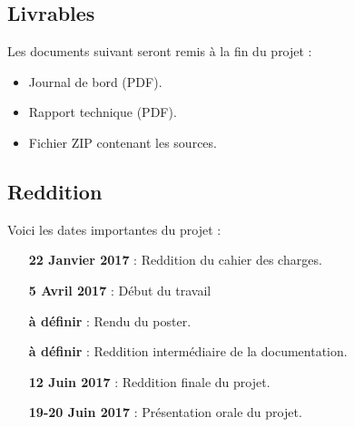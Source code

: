 \documentclass[a4paper, french]{article}
\begin{document}
\subsection{Livrables}
Les documents suivant seront remis à la fin du projet :

\begin{itemize}
    \item Journal de bord (PDF).
    \item Rapport technique (PDF).
    \item Fichier ZIP contenant les sources.
\end{itemize}

\subsection{Reddition}
Voici les dates importantes du projet : 

\begin{framed}
    \begin{itemize}[leftmargin=4cm]
        \item[\textbf{22 Janvier 2017} :] Reddition du cahier des charges.
        \item[\textbf{5 Avril 2017} :] Début du travail
        \item[\textbf{à définir} :] Rendu du poster.
        \item[\textbf{à définir} :] Reddition intermédiaire de la documentation.
        \item[\textbf{12 Juin 2017} :] Reddition finale du projet.
        \item[\textbf{19-20 Juin 2017} :] Présentation orale du projet.
    \end{itemize}
\end{framed}
\end{document}
